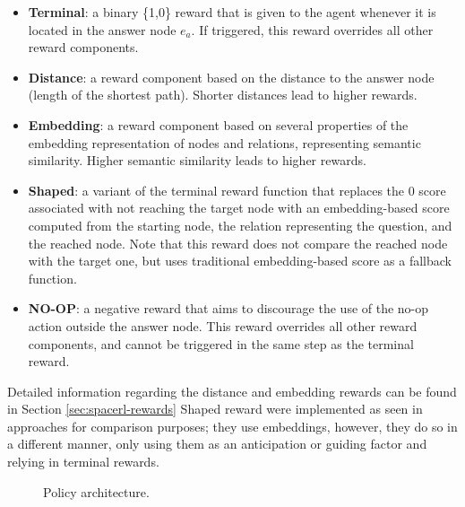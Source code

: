 \begin{itemize}
    \item \textbf{Terminal}: a binary \{1,0\} reward that is given to the agent whenever it is located in the answer node $e_a$. If triggered, this reward overrides all other reward components.
    \item \textbf{Distance}: a reward component based on the distance to the answer node (length of the shortest path). Shorter distances lead to higher rewards.
    \item \textbf{Embedding}: a reward component based on several properties of the embedding representation of nodes and relations, representing semantic similarity. Higher semantic similarity leads to higher rewards.
    \item \textbf{Shaped}: a variant of the terminal reward function that replaces the 0 score associated with not reaching the target node with an embedding-based score computed from the starting node, the relation representing the question, and the reached node. Note that this reward does not compare the reached node with the target one, but uses traditional embedding-based score as a fallback function.
    \item \textbf{NO-OP}: a negative reward that aims to discourage the use of the no-op action outside the answer node. This reward overrides all other reward components, and cannot be triggered in the same step as the terminal reward.
\end{itemize}

Detailed information regarding the distance and embedding rewards can be found in Section \ref{sec:spacerl-rewards} Shaped reward were implemented as seen in approaches \cite{cui2023incorporating, lin2018multi} for comparison purposes; they use embeddings, however, they do so in a  different manner, only using them as an anticipation or guiding factor and relying in terminal rewards.

\begin{figure}[!h]
    \caption{Policy architecture.}
    \label{fig:policy}
\end{figure}

